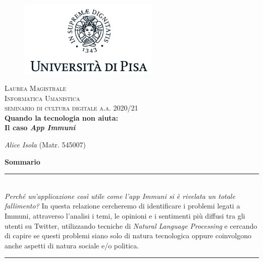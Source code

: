 \documentclass[12pt]{report}
\begin{document}
%
\begin{titlepage}
 \newcommand{\HRule}{\rule{\linewidth}{0.5mm}}
    \begin{figure}
        \centering\includegraphics[width = 0.6\textwidth]{img/logo_unipi.png}
    \end{figure}
    \begin{center}
        \textsc{\LARGE{ Laurea Magistrale \\ Informatica Umanistica \\}} 
        \vspace{0.5cm}
        \textsc{\LARGE{ seminario di cultura digitale a.a. 2020/21 \\}}
        \vspace{1cm}
        \Large{
        \textbf{Quando la tecnologia non aiuta: \\ Il caso \textit{App Immuni}\\}}

        \vspace{0.5cm}
        
        {\large{\textit{Alice Isola} (Matr. 545007)\\ }}
        \vspace{0.5cm}
    
    {\bf Sommario}\\
    \end{center}
    \HRule\\
    \textit{Perché un’applicazione così utile come l’app Immuni si è rivelata un totale fallimento?} In questa relazione cercheremo di identificare i problemi legati a Immuni, attraverso l'analisi i temi, le opinioni e i sentimenti più diffusi tra gli utenti su Twitter, utilizzando tecniche di \textit{Natural Language Processing} e  cercando di capire se questi problemi siano solo di natura tecnologica oppure coinvolgono anche aspetti di natura sociale e/o politica.\\
    \HRule
    
\end{titlepage}

\tableofcontents
\thispagestyle{empty}
\clearpage
\setcounter{page}{1}










\thispagestyle{empty}
\nocite{*}
\printbibliography


\end{document}
